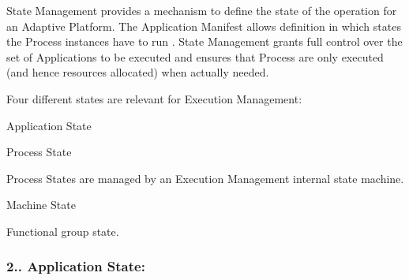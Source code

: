 \begin{DoxyItemize}
\item State Management provides a mechanism to define the state of the operation for an Adaptive Platform. The Application Manifest allows definition in which states the Process instances have to run . State Management grants full control over the set of Applications to be executed and ensures that Process are only executed (and hence resources allocated) when actually needed.
\item Four different states are relevant for Execution Management\+:
\begin{DoxyItemize}
\item Application State
\item Process State
\begin{DoxyItemize}
\item Process States are managed by an Execution Management internal state machine.
\end{DoxyItemize}
\item Machine State
\item Functional group state.
\end{DoxyItemize}
\end{DoxyItemize}

\subsubsection*{2.. {\bfseries Application State\+:}}


